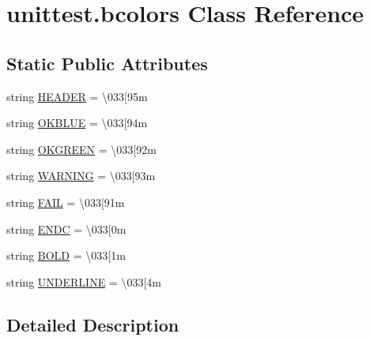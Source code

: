\hypertarget{classunittest_1_1bcolors}{}\section{unittest.\+bcolors Class Reference}
\label{classunittest_1_1bcolors}
\subsection*{Static Public Attributes}
\begin{DoxyCompactItemize}
\item 
string \hyperlink{classunittest_1_1bcolors_a0e8ae760e5f682550fc0b4e5638c47d0}{H\+E\+A\+D\+ER} = \textquotesingle{}\textbackslash{}033\mbox{[}95m\textquotesingle{}
\item 
string \hyperlink{classunittest_1_1bcolors_ac76b755140eefd1ff1eda35552b9ea01}{O\+K\+B\+L\+UE} = \textquotesingle{}\textbackslash{}033\mbox{[}94m\textquotesingle{}
\item 
string \hyperlink{classunittest_1_1bcolors_a4ea0a9b856e4906b0423ae6ae4ac16c8}{O\+K\+G\+R\+E\+EN} = \textquotesingle{}\textbackslash{}033\mbox{[}92m\textquotesingle{}
\item 
string \hyperlink{classunittest_1_1bcolors_acc0c1f9b572e877f80e4017094d3de68}{W\+A\+R\+N\+I\+NG} = \textquotesingle{}\textbackslash{}033\mbox{[}93m\textquotesingle{}
\item 
string \hyperlink{classunittest_1_1bcolors_a2dada3141c1e833e5a3cacd4f39dcf47}{F\+A\+IL} = \textquotesingle{}\textbackslash{}033\mbox{[}91m\textquotesingle{}
\item 
string \hyperlink{classunittest_1_1bcolors_a5db993c726eedb06b4a7efab09551f4e}{E\+N\+DC} = \textquotesingle{}\textbackslash{}033\mbox{[}0m\textquotesingle{}
\item 
string \hyperlink{classunittest_1_1bcolors_a95b491580216e848b313b0918ccea7ea}{B\+O\+LD} = \textquotesingle{}\textbackslash{}033\mbox{[}1m\textquotesingle{}
\item 
string \hyperlink{classunittest_1_1bcolors_ac181b1324b4847e254b738c74ef5fc00}{U\+N\+D\+E\+R\+L\+I\+NE} = \textquotesingle{}\textbackslash{}033\mbox{[}4m\textquotesingle{}
\end{DoxyCompactItemize}


\subsection{Detailed Description}


